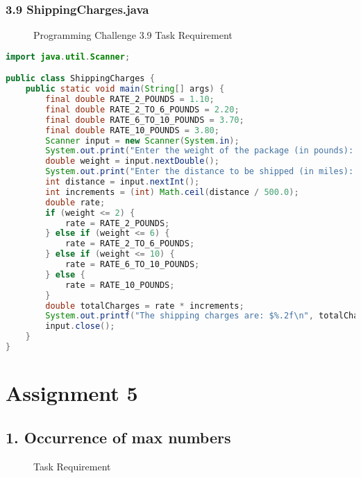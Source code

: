 \documentclass{article}
\begin{document}
\subsubsection*{3.9 ShippingCharges.java}

\begin{figure}[h]
    \centering
    \caption{Programming Challenge 3.9 Task Requirement}
\end{figure}

\begin{lstlisting}[language=Java, caption=ShippingCharges.java]
import java.util.Scanner;

public class ShippingCharges {
    public static void main(String[] args) {
        final double RATE_2_POUNDS = 1.10;
        final double RATE_2_TO_6_POUNDS = 2.20;
        final double RATE_6_TO_10_POUNDS = 3.70;
        final double RATE_10_POUNDS = 3.80;
        Scanner input = new Scanner(System.in);
        System.out.print("Enter the weight of the package (in pounds): ");
        double weight = input.nextDouble();
        System.out.print("Enter the distance to be shipped (in miles): ");
        int distance = input.nextInt();
        int increments = (int) Math.ceil(distance / 500.0);
        double rate;
        if (weight <= 2) {
            rate = RATE_2_POUNDS;
        } else if (weight <= 6) {
            rate = RATE_2_TO_6_POUNDS;
        } else if (weight <= 10) {
            rate = RATE_6_TO_10_POUNDS;
        } else {
            rate = RATE_10_POUNDS;
        }
        double totalCharges = rate * increments;
        System.out.printf("The shipping charges are: $%.2f\n", totalCharges);
        input.close();
    }
}
\end{lstlisting}

\section*{Assignment 5}

\subsection*{1. Occurrence of max numbers}

\begin{figure}[h]
    \centering
    \caption{Task Requirement}
\end{figure}
\end{document}
